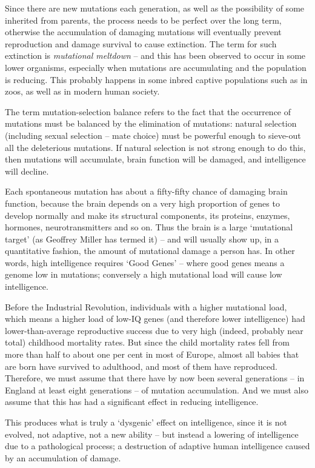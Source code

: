 \documentclass[
]{book}
\begin{document}
Since there are new mutations each generation, as well as the possibility of some inherited from parents, the process needs to be perfect over the long term, otherwise the accumulation of damaging mutations will eventually prevent reproduction and damage survival to cause extinction. The term for such extinction is \emph{mutational meltdown} -- and this has been observed to occur in some lower organisms, especially when mutations are accumulating and the population is reducing. This probably happens in some inbred captive populations such as in zoos, as well as in modern human society.

The term mutation-selection balance refers to the fact that the occurrence of mutations must be balanced by the elimination of mutations: natural selection (including sexual selection -- mate choice) must be powerful enough to sieve-out all the deleterious mutations. If natural selection is not strong enough to do this, then mutations will accumulate, brain function will be damaged, and intelligence will decline.

Each spontaneous mutation has about a fifty-fifty chance of damaging brain function, because the brain depends on a very high proportion of genes to develop normally and make its structural components, its proteins, enzymes, hormones, neurotransmitters and so on. Thus the brain is a large `mutational target' (as Geoffrey Miller has termed it) -- and will usually show up, in a quantitative fashion, the amount of mutational damage a person has. In other words, high intelligence requires `Good Genes' -- where good genes means a genome low in mutations; conversely a high mutational load will cause low intelligence.

Before the Industrial Revolution, individuals with a higher mutational load, which means a higher load of low-IQ genes (and therefore lower intelligence) had lower-than-average reproductive success due to very high (indeed, probably near total) childhood mortality rates. But since the child mortality rates fell from more than half to about one per cent in most of Europe, almost all babies that are born have survived to adulthood, and most of them have reproduced. Therefore, we must assume that there have by now been several generations -- in England at least eight generations -- of mutation accumulation. And we must also assume that this has had a significant effect in reducing intelligence.

This produces what is truly a `dysgenic' effect on intelligence, since it is not evolved, not adaptive, not a new ability -- but instead a lowering of intelligence due to a pathological process; a destruction of adaptive human intelligence caused by an accumulation of damage.
\end{document}
